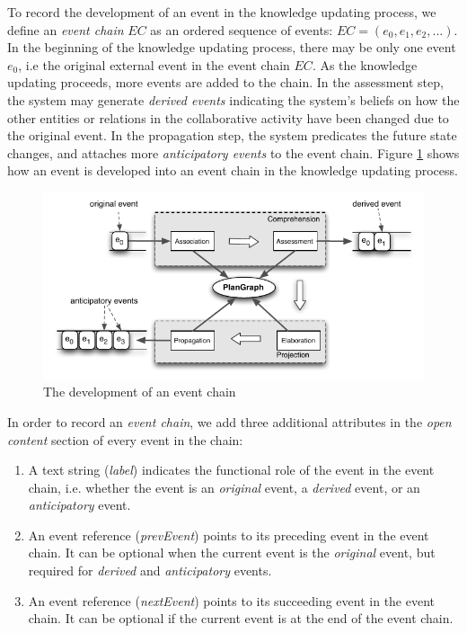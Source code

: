 To record the development of an event in the knowledge updating process, we define an \emph{event chain} $EC$ as an ordered sequence of events: $EC=(e_0, e_1, e_2, ...)$. In the beginning of the knowledge updating process, there may be only one event $e_0$, i.e the original external event in the event chain $EC$. As the knowledge updating proceeds, more events are added to the chain. In the assessment step, the system may generate \emph{derived events} indicating the system's beliefs on how the other entities or relations in the collaborative activity have been changed due to the original event. In the propagation step, the system predicates the future state changes, and attaches more \emph{anticipatory events} to the event chain. Figure \ref{fig:knowledge_updating} shows how an event is developed into an event chain in the knowledge updating process.

\begin{figure}[htbp] %
	\centering
	\includegraphics{knowledge_updating.pdf} 
	\caption{The development of an event chain}
	\label{fig:knowledge_updating}
\end{figure}

In order to record an \emph{event chain}, we add three additional attributes in the \emph{open content} section of every event in the chain:

\begin{enumerate}
 	\item A text string (\emph{label}) indicates the functional role of the event in the event chain, i.e. whether the event is an \emph{original} event, a \emph{derived} event, or an \emph{anticipatory} event.
 	\item An event reference (\emph{prevEvent}) points to its preceding event in the event chain. It can be optional when the current event is the \emph{original} event, but required for \emph{derived} and \emph{anticipatory} events.
 	\item An event reference (\emph{nextEvent}) points to its succeeding event in the event chain. It can be optional if the current event is at the end of the event chain.
 \end{enumerate} 

